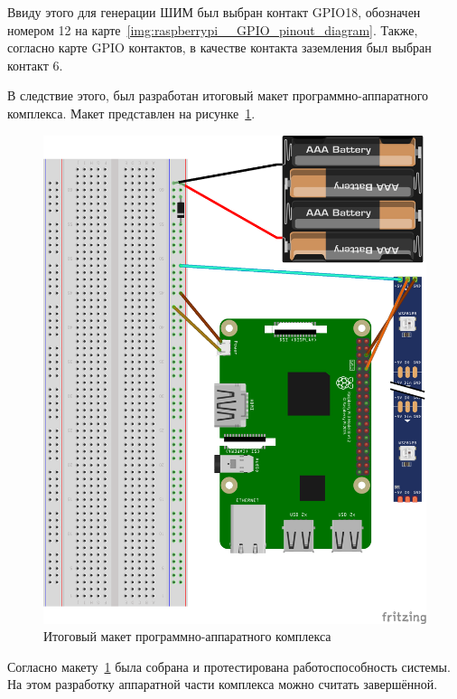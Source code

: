 Ввиду этого для генерации ШИМ был выбран контакт GPIO18, обозначен номером 12 на карте~\ref{img:raspberrypi__GPIO_pinout_diagram}. Также, согласно карте GPIO контактов, в качестве контакта заземления был выбран контакт 6.

В следствие этого, был разработан итоговый макет программно-аппаратного комплекса. Макет представлен на рисунке~\ref{img:all__schema}.

\begin{figure}[H]
  \centering
  \includegraphics[height=0.4\textheight]{assets/images/practical/Итоговая архитектура программно-аппаратного комплекса.png}
  \caption{Итоговый макет программно-аппаратного комплекса}
  \label{img:all__schema}
\end{figure}

Согласно макету~\ref{img:all__schema} была собрана и протестирована работоспособность системы. На этом разработку аппаратной части комплекса можно считать завершённой.